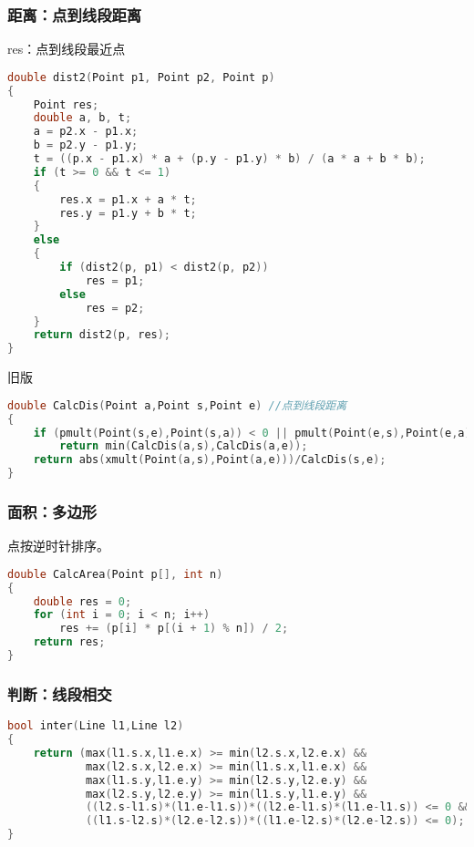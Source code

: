     \subsubsection{距离：点到线段距离}
        res：点到线段最近点
        \begin{lstlisting}[language=c++]
double dist2(Point p1, Point p2, Point p)
{
    Point res;
    double a, b, t;
    a = p2.x - p1.x;
    b = p2.y - p1.y;
    t = ((p.x - p1.x) * a + (p.y - p1.y) * b) / (a * a + b * b);
    if (t >= 0 && t <= 1)
    {
        res.x = p1.x + a * t;
        res.y = p1.y + b * t;
    }
    else
    {
        if (dist2(p, p1) < dist2(p, p2))
            res = p1;
        else
            res = p2;
    }
    return dist2(p, res);
}
        \end{lstlisting}
        旧版
        \begin{lstlisting}[language=c++]
double CalcDis(Point a,Point s,Point e) //点到线段距离
{
    if (pmult(Point(s,e),Point(s,a)) < 0 || pmult(Point(e,s),Point(e,a)) < 0)
        return min(CalcDis(a,s),CalcDis(a,e));
    return abs(xmult(Point(a,s),Point(a,e)))/CalcDis(s,e);
}
        \end{lstlisting}
        
    \subsubsection{面积：多边形}
        点按逆时针排序。
        \begin{lstlisting}[language=c++]
double CalcArea(Point p[], int n)
{
    double res = 0;
    for (int i = 0; i < n; i++)
        res += (p[i] * p[(i + 1) % n]) / 2;
    return res;
}
        \end{lstlisting}
	
    \subsubsection{判断：线段相交}
        \begin{lstlisting}[language=c++]
bool inter(Line l1,Line l2)
{
    return (max(l1.s.x,l1.e.x) >= min(l2.s.x,l2.e.x) &&
            max(l2.s.x,l2.e.x) >= min(l1.s.x,l1.e.x) &&
            max(l1.s.y,l1.e.y) >= min(l2.s.y,l2.e.y) &&
            max(l2.s.y,l2.e.y) >= min(l1.s.y,l1.e.y) &&
            ((l2.s-l1.s)*(l1.e-l1.s))*((l2.e-l1.s)*(l1.e-l1.s)) <= 0 &&
            ((l1.s-l2.s)*(l2.e-l2.s))*((l1.e-l2.s)*(l2.e-l2.s)) <= 0);
}
        \end{lstlisting}
